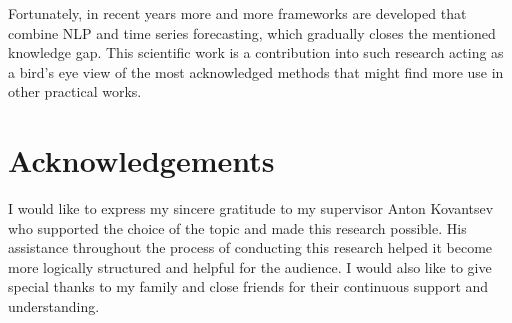 \documentclass[3p,times,procedia]{elsarticle}
\begin{document}
Fortunately, in recent years more and more frameworks are developed that combine NLP and time series forecasting, which gradually closes the mentioned knowledge gap. This scientific work is a contribution into such research acting as a bird's eye view of the most acknowledged methods that might find more use in other practical works. 

\section*{Acknowledgements}

I would like to express my sincere gratitude to my supervisor Anton Kovantsev who supported the choice of the topic and made this research possible. His assistance throughout the process of conducting this research helped it become more logically structured and helpful for the audience. I would also like to give special thanks to my family and close friends for their continuous support and understanding.





%
%



{}

\end{document}
